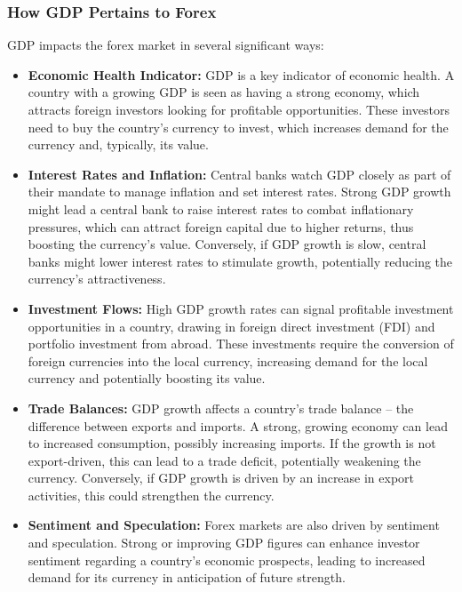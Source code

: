 \documentclass{report}
\begin{document}
     \subsubsection{How GDP Pertains to Forex}
     \bigbreak \noindent 
     GDP impacts the forex market in several significant ways:
     \begin{itemize}
         \item \textbf{Economic Health Indicator:} GDP is a key indicator of economic health. A country with a growing GDP is seen as having a strong economy, which attracts foreign investors looking for profitable opportunities. These investors need to buy the country’s currency to invest, which increases demand for the currency and, typically, its value.
         \item \textbf{Interest Rates and Inflation:} Central banks watch GDP closely as part of their mandate to manage inflation and set interest rates. Strong GDP growth might lead a central bank to raise interest rates to combat inflationary pressures, which can attract foreign capital due to higher returns, thus boosting the currency's value. Conversely, if GDP growth is slow, central banks might lower interest rates to stimulate growth, potentially reducing the currency's attractiveness.
         \item \textbf{Investment Flows:} High GDP growth rates can signal profitable investment opportunities in a country, drawing in foreign direct investment (FDI) and portfolio investment from abroad. These investments require the conversion of foreign currencies into the local currency, increasing demand for the local currency and potentially boosting its value.
         \item \textbf{Trade Balances:} GDP growth affects a country’s trade balance – the difference between exports and imports. A strong, growing economy can lead to increased consumption, possibly increasing imports. If the growth is not export-driven, this can lead to a trade deficit, potentially weakening the currency. Conversely, if GDP growth is driven by an increase in export activities, this could strengthen the currency.
             \item \textbf{Sentiment and Speculation:} Forex markets are also driven by sentiment and speculation. Strong or improving GDP figures can enhance investor sentiment regarding a country’s economic prospects, leading to increased demand for its currency in anticipation of future strength.
     \end{itemize}
\end{document}
